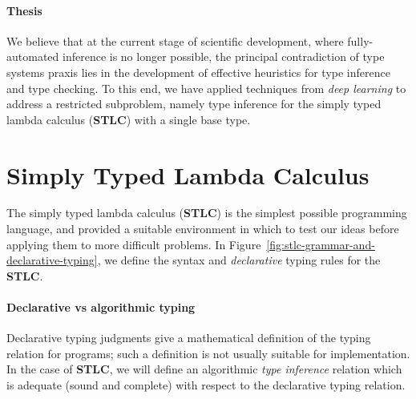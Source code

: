 \documentclass[twocolumn,9pt]{article}
\theoremstyle{definition}
\theoremstyle{remark}
\numberwithin{equation}{section}
\newcommand\STLC{\textbf{STLC}}
\begin{document}
\paragraph{Thesis}
We believe that at the current stage of scientific development, where
fully-automated inference is no longer possible, the principal
contradiction of type systems praxis lies in the development of
effective heuristics for type inference and type checking. To this
end, we have applied techniques from \emph{deep learning} to address a
restricted subproblem, namely type inference for the simply typed
lambda calculus (\STLC{}) with a single base type.

\section{Simply Typed Lambda Calculus}
The simply typed lambda calculus (\STLC{}) is the simplest possible
programming language, and provided a suitable environment in which to
test our ideas before applying them to more difficult problems. In
Figure~\ref{fig:stlc-grammar-and-declarative-typing}, we define the
syntax and \emph{declarative} typing rules for the \STLC{}.

\paragraph{Declarative vs algorithmic typing}
Declarative typing judgments give a mathematical definition of the
typing relation for programs; such a definition is not usually
suitable for implementation. In the case of \STLC{}, we will define an
algorithmic \emph{type inference} relation which is adequate (sound
and complete) with respect to the declarative typing relation.
\end{document}
